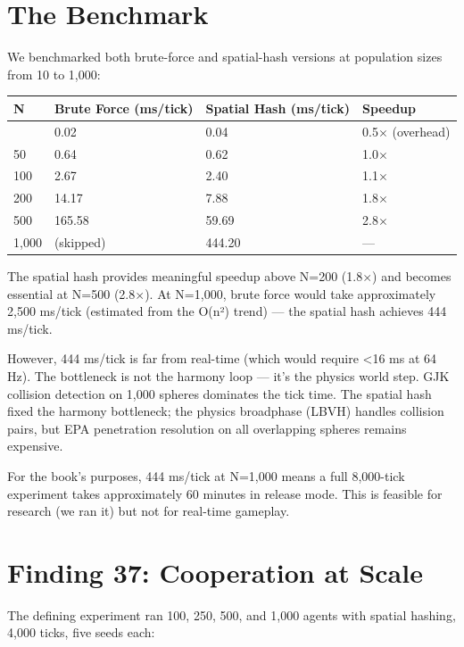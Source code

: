 \section{The Benchmark}\label{the-benchmark}

We benchmarked both brute-force and spatial-hash versions at population sizes from 10 to 1,000:

\begin{longtable}[]{@{}llll@{}}
\toprule\noalign{}
N & Brute Force (ms/tick) & Spatial Hash (ms/tick) & Speedup \\
\midrule\noalign{}
\endhead
\bottomrule\noalign{}
\endlastfoot
10 & 0.02 & 0.04 & 0.5$\times$ (overhead) \\
50 & 0.64 & 0.62 & 1.0$\times$ \\
100 & 2.67 & 2.40 & 1.1$\times$ \\
200 & 14.17 & 7.88 & 1.8$\times$ \\
500 & 165.58 & 59.69 & 2.8$\times$ \\
1,000 & (skipped) & 444.20 & --- \\
\end{longtable}

The spatial hash provides meaningful speedup above N=200 (1.8$\times$) and becomes essential at N=500 (2.8$\times$). At N=1,000, brute force would take approximately 2,500 ms/tick (estimated from the O(n²) trend) --- the spatial hash achieves 444 ms/tick.

However, 444 ms/tick is far from real-time (which would require \textless16 ms at 64 Hz). The bottleneck is not the harmony loop --- it's the physics world step. GJK collision detection on 1,000 spheres dominates the tick time. The spatial hash fixed the harmony bottleneck; the physics broadphase (LBVH) handles collision pairs, but EPA penetration resolution on all overlapping spheres remains expensive.

For the book's purposes, 444 ms/tick at N=1,000 means a full 8,000-tick experiment takes approximately 60 minutes in release mode. This is feasible for research (we ran it) but not for real-time gameplay.

\section{Finding 37: Cooperation at Scale}\label{finding-37-cooperation-at-scale}

The defining experiment ran 100, 250, 500, and 1,000 agents with spatial hashing, 4,000 ticks, five seeds each:

